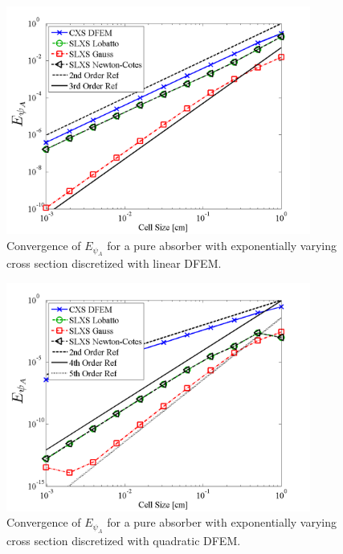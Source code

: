 \begin{figure}[!htp]
\centering
\includegraphics[width=10cm]{chapter3_variable_xs/P1_VarXS_E_psi_A.png}
\caption{Convergence of $E_{\psi_A}$  for a pure absorber with exponentially varying cross section discretized with linear DFEM.}
\label{fig:varxs_psi_A_p1}
\end{figure}
%
\begin{figure}[!hbp]
\centering
\includegraphics[width=10cm]{chapter3_variable_xs/P2_VarXS_E_psi_A.png}
\caption{Convergence of $E_{\psi_A}$ for a pure absorber with exponentially varying cross section discretized with quadratic DFEM.}
\label{fig:varxs_psi_A_p2}
\end{figure}
%


